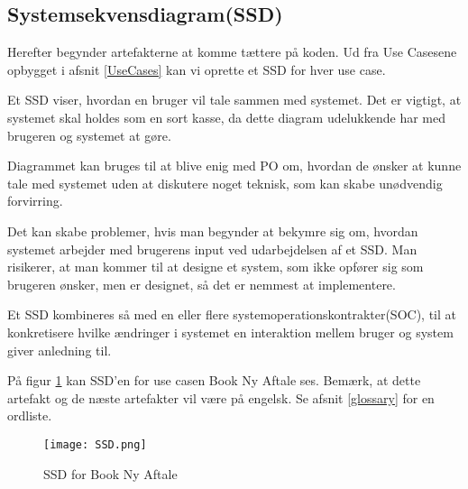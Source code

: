\subsection{Systemsekvensdiagram(SSD)}
\label{SSD}

Herefter begynder artefakterne at komme tættere på koden.
Ud fra Use Casesene opbygget i afsnit \ref{UseCases} kan vi oprette et SSD for hver use case.

Et SSD viser, hvordan en bruger vil tale sammen med systemet.
Det er vigtigt, at systemet skal holdes som en sort kasse, da dette diagram udelukkende har med brugeren og systemet at gøre.

Diagrammet kan bruges til at blive enig med PO om, hvordan de ønsker at kunne tale med systemet uden at diskutere noget teknisk, som kan skabe unødvendig forvirring.

Det kan skabe problemer, hvis man begynder at bekymre sig om, hvordan systemet arbejder med brugerens input ved udarbejdelsen af et SSD.
Man risikerer, at man kommer til at designe et system, som ikke opfører sig som brugeren ønsker, men er designet, så det er nemmest at implementere.

Et SSD kombineres så med en eller flere systemoperationskontrakter(SOC), til at konkretisere hvilke ændringer i systemet en interaktion mellem bruger og system giver anledning til.

På figur \ref{forretning:ssd} kan SSD'en for use casen Book Ny Aftale ses.
Bemærk, at dette artefakt og de næste artefakter vil være på engelsk.
Se afsnit \ref{glossary} for en ordliste.

\begin{figure}[H]
    \caption{SSD for Book Ny Aftale}
    \centering
        \texttt{[image: SSD.png]}
    \label{forretning:ssd}
\end{figure}